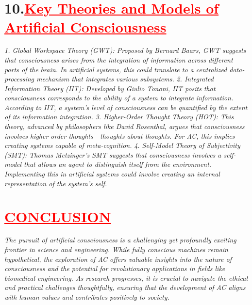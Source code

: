 \documentclass[12pt]{article}
\begin{document}
\section*{\textbf{10.\hspace{1cm}\textcolor{red}{\underline{\large{Key Theories and Models of Artificial Consciousness}}}}}
\hspace{1cm}\large{\emph{1. Global Workspace Theory (GWT): Proposed by Bernard Baars, GWT suggests that consciousness arises from the integration of information across different parts of the brain. In artificial systems, this could translate to a centralized data-processing mechanism that integrates various subsystems.}}\vspace{1cm}\newline
\hspace{1cm}\large{\emph{2. Integrated Information Theory (IIT): Developed by Giulio Tononi, IIT posits that consciousness corresponds to the ability of a system to integrate information. According to IIT, a system's level of consciousness can be quantified by the extent of its information integration.}}\vspace{1cm}\newline
\hspace{1cm}\large{\emph{3. Higher-Order Thought Theory (HOT): This theory, advanced by philosophers like David Rosenthal, argues that consciousness involves higher-order thoughts—thoughts about thoughts. For AC, this implies creating systems capable of meta-cognition.}}\vspace{1cm}\newline
\hspace{1cm}\large{\emph{4. Self-Model Theory of Subjectivity (SMT): Thomas Metzinger’s SMT suggests that consciousness involves a self-model that allows an agent to distinguish itself from the environment. Implementing this in artificial systems could involve creating an internal representation of the system's self.}}\vspace{1cm}\newline
\section*{\textbf{\textcolor{red}{\underline{\large{CONCLUSION}}}}}
\hspace{1cm}\large{\emph{The pursuit of artificial consciousness is a challenging yet profoundly exciting frontier in science and engineering. While fully conscious machines remain hypothetical, the exploration of AC offers valuable insights into the nature of consciousness and the potential for revolutionary applications in fields like biomedical engineering. As research progresses, it is crucial to navigate the ethical and practical challenges thoughtfully, ensuring that the development of AC aligns with human values and contributes positively to society.}}\vspace{1cm}\newline
\end{document}
